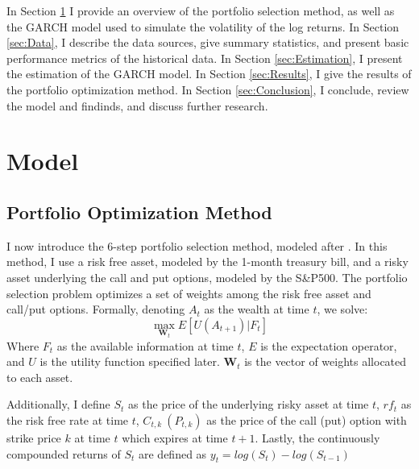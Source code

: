 In Section \ref{sec:Model} I provide an overview of the portfolio selection method, as well as the GARCH model used to simulate the volatility of the log returns. In Section \ref{sec:Data}, I describe the data sources, give summary statistics, and present basic performance metrics of the historical data. In Section \ref{sec:Estimation}, I present the estimation of the GARCH model. In Section \ref{sec:Results}, I give the results of the portfolio optimization method. In Section \ref{sec:Conclusion}, I conclude, review the model and findinds, and discuss further research.

\section{Model}\label{sec:Model}

\subsection{Portfolio Optimization Method}

I now introduce the 6-step portfolio selection method, modeled after \cite{faias2017optimal}. In this method, I use a risk free asset, modeled by the 1-month treasury bill, and a risky asset underlying the call and put options, modeled by the S\&P500. The portfolio selection problem optimizes a set of weights among the risk free asset and call/put options. Formally, denoting $A_{t}$ as the wealth at time $t$, we solve:
\noindent
\[\max_{\mathbf{W}_{t}} E[U(A_{t+1})|F_{t}]\]
\noindent
Where $F_{t}$ as the available information at time $t$, $E$ is the expectation operator, and $U$ is the utility function specified later. $\mathbf{W}_{t}$ is the vector of weights allocated to each asset.

Additionally, I define $S_{t}$ as the price of the underlying risky asset at time $t$, $rf_{t}$ as the risk free rate at time $t$, $C_{t, k} \ (P_{t, k})$ as the price of the call (put) option with strike price $k$ at time $t$ which expires at time $t + 1$. Lastly, the continuously compounded returns of $S_{t}$ are defined as $y_{t} = log(S_{t}) - log(S_{t - 1})$

